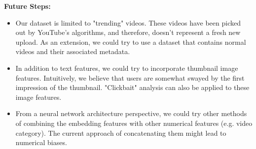 \documentclass[english]{article}
\begin{document}
\textbf{Future Steps:} 
\begin{itemize}
    \item Our dataset is limited to "trending" videos. These videos have been picked out by YouTube's algorithms, and therefore, doesn't represent a fresh new upload. As an extension, we could try to use a dataset that contains normal videos and their associated metadata. 
    \item In addition to text features, we could try to incorporate thumbnail image features. Intuitively, we believe that users are somewhat swayed by the first impression of the thumbnail. "Clickbait" analysis can also be applied to these image features.
    \item From a neural network architecture perspective, we could try other methods of combining the embedding features with other numerical features (e.g. video category). The current approach of concatenating them might lead to numerical biases.
\end{itemize}



\newpage



\end{document}

